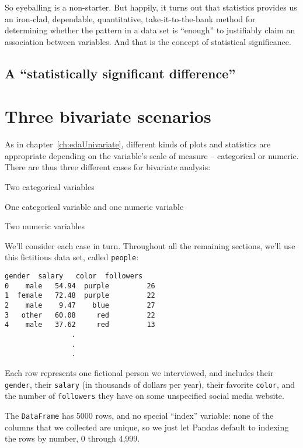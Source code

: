 So eyeballing is a non-starter. But happily, it turns out that statistics
provides us an iron-clad, dependable, quantitative, take-it-to-the-bank method
for determining whether the pattern in a data set is ``enough'' to justifiably
claim an association between variables. And that is the concept of statistical
significance.

\subsection{A ``statistically significant difference''}

\section{Three bivariate scenarios}

As in chapter~\ref{ch:edaUnivariate}, different kinds of plots and statistics
are appropriate depending on the variable's scale of measure -- categorical or
numeric. There are thus three different cases for bivariate analysis:

\begin{compactitem}
\item Two categorical variables
\item One categorical variable and one numeric variable
\item Two numeric variables
\end{compactitem}

We'll consider each case in turn. Throughout all the remaining sections, we'll
use this fictitious data set, called \texttt{people}:

\begin{Verbatim}[fontsize=\small,samepage=true,frame=leftline,framesep=5mm,framerule=1mm]
   gender  salary   color  followers
0    male   54.94  purple         26
1  female   72.48  purple         22
2    male    9.47    blue         27
3   other   60.08     red         22
4    male   37.62     red         13
                .
                .
                .
\end{Verbatim}

Each row represents one fictional person we interviewed, and includes their 
\texttt{gender}, their \texttt{salary} (in thousands of dollars per year),
their favorite \texttt{color}, and the number of \texttt{followers} they have
on some unspecified social media website.

The \texttt{DataFrame} has 5000 rows, and no special ``index'' variable: none
of the columns that we collected are unique, so we just let Pandas default to
indexing the rows by number, 0 through 4,999.


